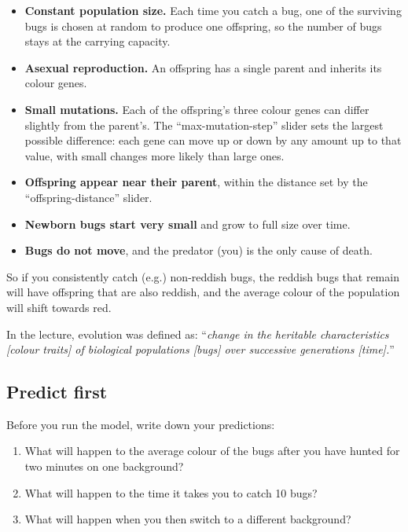 \documentclass[
  a4paper]{book}
\providecommand{\tightlist}{%
  \setlength{\itemsep}{0pt}\setlength{\parskip}{0pt}}
\begin{document}
\begin{itemize}
\tightlist
\item
  \textbf{Constant population size.} Each time you catch a bug, one of the surviving bugs is chosen at random to produce one offspring, so the number of bugs stays at the carrying capacity.
\item
  \textbf{Asexual reproduction.} An offspring has a single parent and inherits its colour genes.
\item
  \textbf{Small mutations.} Each of the offspring's three colour genes can differ slightly from the parent's. The ``max-mutation-step'' slider sets the largest possible difference: each gene can move up or down by any amount up to that value, with small changes more likely than large ones.
\item
  \textbf{Offspring appear near their parent}, within the distance set by the ``offspring-distance'' slider.
\item
  \textbf{Newborn bugs start very small} and grow to full size over time.
\item
  \textbf{Bugs do not move}, and the predator (you) is the only cause of death.
\end{itemize}

So if you consistently catch (e.g.) non-reddish bugs, the reddish bugs that remain will have offspring that are also reddish, and the average colour of the population will shift towards red.

In the lecture, evolution was defined as: ``\emph{change in the heritable characteristics {[}colour traits{]} of biological populations {[}bugs{]} over successive generations {[}time{]}.}''

\subsection{Predict first}\label{predict-first}

Before you run the model, write down your predictions:

\begin{enumerate}
\def\labelenumi{\arabic{enumi}.}
\tightlist
\item
  What will happen to the average colour of the bugs after you have hunted for two minutes on one background?
\item
  What will happen to the time it takes you to catch 10 bugs?
\item
  What will happen when you then switch to a different background?
\end{enumerate}
\end{document}
